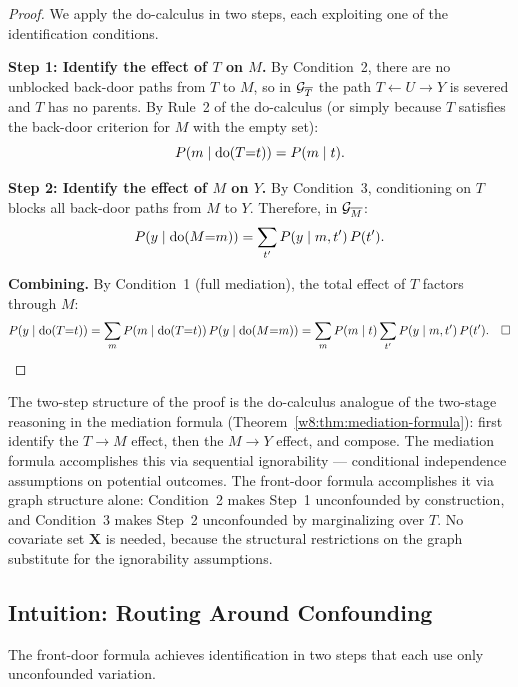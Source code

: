 \documentclass[master.tex]{subfiles}
\begin{document}
\begin{proof}
We apply the do-calculus in two steps, each exploiting one of the
identification conditions.

\medskip\noindent\textbf{Step 1: Identify the effect of $T$ on $M$.}
By Condition~2, there are no unblocked back-door paths from $T$ to $M$,
so in $\mathcal{G}_{\overline{T}}$ the path $T \leftarrow U \to Y$ is severed
and $T$ has no parents.  By Rule~2 of the do-calculus (or simply
because $T$ satisfies the back-door criterion for $M$ with the empty
set):
\[
  P\!\left(m \mid \mathrm{do}(T{=}t)\right) = P(m \mid t).
\]

\medskip\noindent\textbf{Step 2: Identify the effect of $M$ on $Y$.}
By Condition~3, conditioning on $T$ blocks all back-door paths from $M$
to $Y$.  Therefore, in $\mathcal{G}_{\overline{M}}$:
\[
  P\!\left(y \mid \mathrm{do}(M{=}m)\right)
  = \sum_{t'} P(y \mid m, t')\, P(t').
\]

\medskip\noindent\textbf{Combining.}  By Condition~1 (full mediation),
the total effect of $T$ factors through $M$:
\[
  P\!\left(y \mid \mathrm{do}(T{=}t)\right)
  = \sum_m P\!\left(m \mid \mathrm{do}(T{=}t)\right)
    P\!\left(y \mid \mathrm{do}(M{=}m)\right)
  = \sum_m P(m \mid t)
    \sum_{t'} P(y \mid m, t')\, P(t'). \quad\square
\]
\end{proof}

\begin{remark}
The two-step structure of the proof is the do-calculus analogue of the
two-stage reasoning in the mediation formula
(Theorem~\ref{w8:thm:mediation-formula}): first identify the $T \to M$
effect, then the $M \to Y$ effect, and compose.  The mediation formula
accomplishes this via sequential ignorability --- conditional independence
assumptions on potential outcomes.  The front-door formula accomplishes
it via graph structure alone: Condition~2 makes Step~1 unconfounded by
construction, and Condition~3 makes Step~2 unconfounded by marginalizing
over $T$.  No covariate set $\mathbf{X}$ is needed, because the
structural restrictions on the graph substitute for the ignorability
assumptions.
\end{remark}

\subsection{Intuition: Routing Around Confounding}

The front-door formula achieves identification in two steps that each
use only unconfounded variation.
\end{document}
